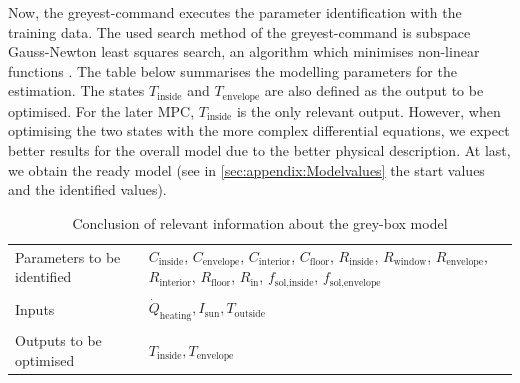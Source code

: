     Now, the greyest-command executes the parameter identification with the training data. The used search method of the greyest-command is subspace Gauss-Newton least squares search, an algorithm which minimises non-linear functions \cite{Jarre.2019}. The table below summarises the modelling parameters for the estimation. The states $T_\text{inside}$ and $T_\text{envelope}$ are also defined as the output to be optimised. For the later MPC, $T_\text{inside}$ is the only relevant output. However, when optimising the two states with the more complex differential equations, we expect better results for the overall model due to the better physical description.
    At last, we obtain the ready model (see in \autoref{sec:appendix:Modelvalues} the start values and the identified values).
     
    \begin{table}[]
        \centering
        \begin{tabular}{p{5cm}|p{8cm}}
        Parameters to be identified &  $C_\text{inside}$,  $C_\text{envelope}$,  $C_\text{interior}$, $C_\text{floor}$, $R_\text{inside}$, $R_\text{window}$, $R_\text{envelope}$, $R_\text{interior}$, $R_\text{floor}$, $R_\text{in}$, $f_\text{sol,inside}$, $f_\text{sol,envelope}$ \\
        &\\
        Inputs & $\dot{Q}_\text{heating}, I_\text{sun}, T_\text{outside}$\\
        &\\
        Outputs to be optimised & $T_\text{inside}, T_\text{envelope}$
        \end{tabular}
        \caption{Conclusion of relevant information about the grey-box model}
        \label{tab:Greybox}
    \end{table}
    
